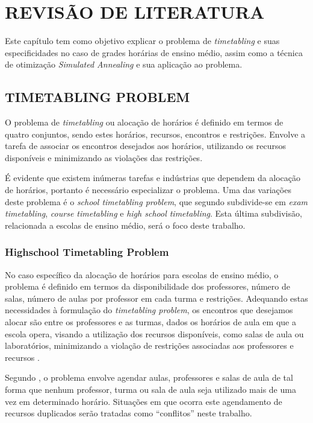 
\chapter{REVISÃO DE LITERATURA}
\label{chap:fundamentacaoTeorica}

Este capítulo tem como objetivo explicar o problema de \textit{timetabling} e suas especificidades no caso de grades horárias de ensino médio, assim como a técnica de otimização \textit{Simulated Annealing} e sua aplicação ao problema.

\section{TIMETABLING PROBLEM}
O problema de \textit{timetabling} ou alocação de horários é definido em termos de quatro conjuntos, sendo estes horários, recursos, encontros e restrições. Envolve a tarefa de associar os encontros desejados aos horários, utilizando os recursos disponíveis e minimizando as violações das restrições.

É evidente que existem inúmeras tarefas e indústrias que dependem da alocação de horários, portanto é necessário especializar o problema. Uma das variações deste problema é o \textit{school timetabling problem}, que segundo  subdivide-se em \textit{exam timetabling}, \textit{course timetabling} e \textit{high school timetabling}. Esta última subdivisão, relacionada a escolas de ensino médio, será o foco deste trabalho.

\subsection{Highschool Timetabling Problem}
No caso específico da alocação de horários para escolas de ensino médio, o problema é definido em termos da disponibilidade dos professores, número de salas, número de aulas por professor em cada turma e restrições. Adequando estas necessidades à formulação do \textit{timetabling problem}, os encontros que desejamos alocar são entre os professores e as turmas, dados os horários de aula em que a escola opera, visando a utilização dos recursos disponíveis, como salas de aula ou laboratórios, minimizando a violação de restrições associadas aos professores e recursos \cite{TAN2021113943}.

Segundo , o problema envolve agendar aulas, professores e salas de aula de tal forma que nenhum professor, turma ou sala de aula seja utilizado mais de uma vez em determinado horário. Situações em que ocorra este agendamento de recursos duplicados serão tratadas como ``conflitos'' neste trabalho.

